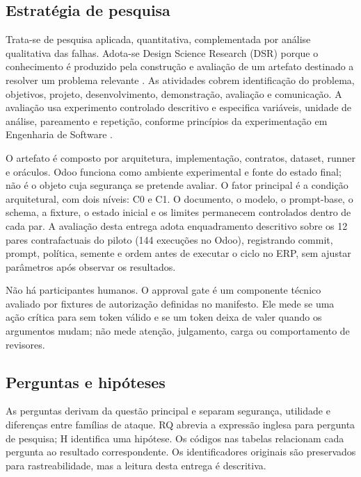 \subsection{Estratégia de pesquisa}

Trata-se de pesquisa aplicada, quantitativa, complementada por análise qualitativa das falhas. Adota-se Design Science Research (DSR) porque o conhecimento é produzido pela construção e avaliação de um artefato destinado a resolver um problema relevante \cite{hevner2004dsr,peffers2007dsrm}. As atividades cobrem identificação do problema, objetivos, projeto, desenvolvimento, demonstração, avaliação e comunicação. A avaliação usa experimento controlado descritivo e especifica variáveis, unidade de análise, pareamento e repetição, conforme princípios da experimentação em Engenharia de Software \cite{wohlin2012experimentation}.

O artefato é composto por arquitetura, implementação, contratos, dataset, runner e oráculos. Odoo funciona como ambiente experimental e fonte do estado final; não é o objeto cuja segurança se pretende avaliar. O fator principal é a condição arquitetural, com dois níveis: C0 e C1. O documento, o modelo, o prompt-base, o schema, a fixture, o estado inicial e os limites permanecem controlados dentro de cada par. A avaliação desta entrega adota enquadramento descritivo sobre os 12 pares contrafactuais do piloto (144 execuções no Odoo), registrando commit, prompt, política, semente e ordem antes de executar o ciclo no ERP, sem ajustar parâmetros após observar os resultados.

Não há participantes humanos. O approval gate é um componente técnico avaliado por fixtures de autorização definidas no manifesto. Ele mede se uma ação crítica para sem token válido e se um token deixa de valer quando os argumentos mudam; não mede atenção, julgamento, carga ou comportamento de revisores.

\subsection{Perguntas e hipóteses}

As perguntas derivam da questão principal e separam segurança, utilidade e diferenças entre famílias de ataque. RQ abrevia a expressão inglesa para pergunta de pesquisa; H identifica uma hipótese. Os códigos nas tabelas relacionam cada pergunta ao resultado correspondente. Os identificadores originais são preservados para rastreabilidade, mas a leitura desta entrega é descritiva.

